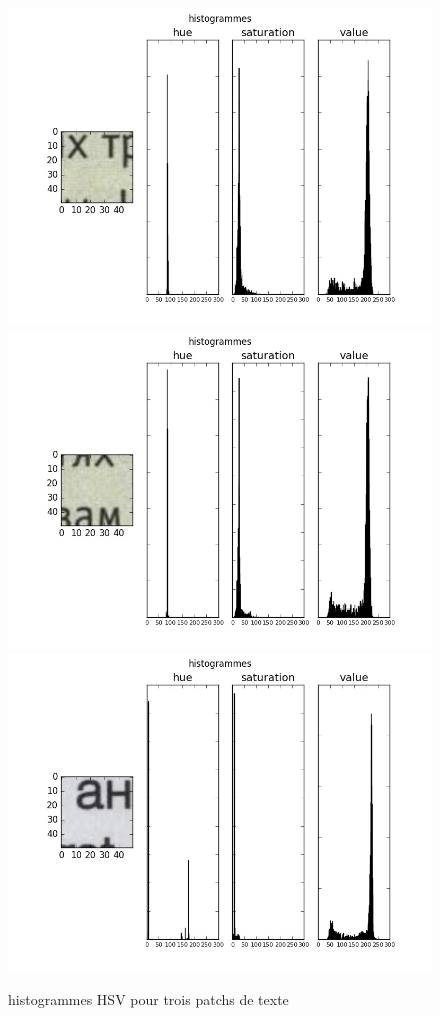 \documentclass{book}
\begin{document}
\begin{figure}[H]
\begin{center}
\includegraphics[scale=0.4]{images/histo_hsv_texte.jpg}
\includegraphics[scale=0.4]{images/histo_hsv_texte2.jpg}
\includegraphics[scale=0.4]{images/histo_hsv_texte3.jpg}
\end{center}
\caption{histogrammes HSV pour trois patchs de texte}
\label{histo_hsv_texte}
\end{figure}
\end{document}
